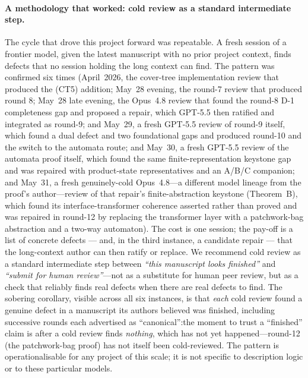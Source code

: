 \documentclass[
]{ceurart}
\theoremstyle{definition}
\begin{document}
\paragraph{A methodology that worked: cold review as a standard
intermediate step.}  The cycle that drove this project forward
was repeatable.  A fresh session of a frontier model, given the
latest manuscript with no prior project context, finds defects
that no session holding the long context can find.  The pattern
was confirmed six times (April~2026, the cover-tree
implementation review that produced the (CT5) addition; May~28
evening, the round-7 review that produced round 8; May~28 late
evening, the Opus~4.8 review that found the round-8 D-1
completeness gap and proposed a repair, which GPT-5.5 then ratified
and integrated as round-9; and May~29, a fresh GPT-5.5 review of
round-9 itself, which found a dual defect and two foundational gaps and
produced round-10 and the switch to the automata route; and May~30, a
fresh GPT-5.5 review of the automata proof itself, which found the same
finite-representation keystone gap and was repaired with product-state
representatives and an A/B/C companion; and May~31, a fresh
genuinely-cold Opus~4.8---a different model lineage from the proof's
author---review of that repair's finite-abstraction keystone
(Theorem~B), which found its interface-transformer coherence asserted
rather than proved and was repaired in round-12 by replacing the
transformer layer with a patchwork-bag abstraction and a two-way
automaton).  The cost is one session; the pay-off is a list of concrete defects --- and, in the
third instance, a candidate repair --- that the long-context author can
then ratify or replace.  We recommend cold review as a
standard intermediate step between \emph{``this manuscript looks
finished''} and \emph{``submit for human review''}---not as a
substitute for human peer review, but as a check that reliably
finds real defects when there are real defects to find.  The
sobering corollary, visible across all six instances, is that
\emph{each} cold review found a genuine defect in a manuscript its
authors believed was finished, including successive rounds each
advertised as ``canonical'':\@ the moment to trust a
``finished'' claim is after a cold review finds \emph{nothing},
which has not yet happened---round-12 (the patchwork-bag proof) has
not itself been cold-reviewed.  The pattern is operationalisable
for any project of this scale; it is not specific to description
logic or to these particular models.
\end{document}
